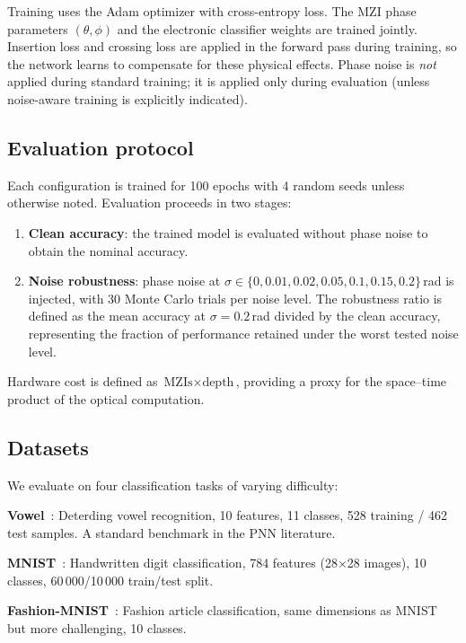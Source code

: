 \documentclass[11pt,a4paper]{article}
\begin{document}
Training uses the Adam optimizer with cross-entropy loss.  The MZI phase parameters
$(\theta, \phi)$ and the electronic classifier weights are trained jointly.
Insertion loss and crossing loss are applied in the forward pass during training,
so the network learns to compensate for these physical effects.  Phase noise is
\emph{not} applied during standard training; it is applied only during evaluation
(unless noise-aware training is explicitly indicated).

\subsection{Evaluation protocol}
\label{sec:eval}

Each configuration is trained for 100 epochs with 4 random seeds unless otherwise
noted.  Evaluation proceeds in two stages:
\begin{enumerate}
  \item \textbf{Clean accuracy}: the trained model is evaluated without phase noise
        to obtain the nominal accuracy.
  \item \textbf{Noise robustness}: phase noise at $\sigma \in \{0, 0.01, 0.02,
        0.05, 0.1, 0.15, 0.2\}$\,rad is injected, with 30 Monte Carlo trials per
        noise level.  The robustness ratio is defined as the mean accuracy at
        $\sigma{=}0.2$\,rad divided by the clean accuracy, representing the fraction
        of performance retained under the worst tested noise level.
\end{enumerate}

Hardware cost is defined as $\text{MZIs} \times \text{depth}$, providing a proxy
for the space--time product of the optical computation.

\subsection{Datasets}
\label{sec:datasets}

We evaluate on four classification tasks of varying difficulty:

\textbf{Vowel}~\cite{shen2017}: Deterding vowel recognition, 10 features, 11
classes, 528 training / 462 test samples.  A standard benchmark in the PNN
literature.

\textbf{MNIST}~\cite{lecun1998}: Handwritten digit classification, 784 features
(28$\times$28 images), 10 classes, 60\,000/10\,000 train/test split.

\textbf{Fashion-MNIST}~\cite{xiao2017}: Fashion article classification, same
dimensions as MNIST but more challenging, 10 classes.
\end{document}

